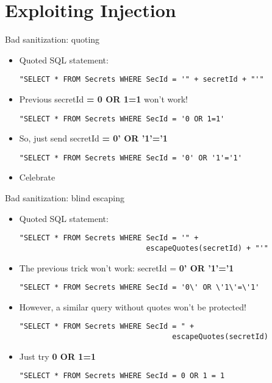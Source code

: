 \section{Exploiting Injection}

\begin{frame}[fragile]{Bad sanitization: quoting}
  \ccode
  \begin{itemize}
    \item Quoted SQL statement:
\begin{lstlisting}
"SELECT * FROM Secrets WHERE SecId = '" + secretId + "'"
\end{lstlisting}
\pause
    \item Previous secretId \textbf{= 0 OR 1=1} won't work!
\begin{lstlisting}
"SELECT * FROM Secrets WHERE SecId = '0 OR 1=1'
\end{lstlisting}
\pause
    \item So, just send secretId \textbf{= 0' OR '1'='1}
\begin{lstlisting}
"SELECT * FROM Secrets WHERE SecId = '0' OR '1'='1'
\end{lstlisting}
    \item Celebrate
  \end{itemize}
\end{frame}

\begin{frame}[fragile]{Bad sanitization: blind escaping}
  \ccode
  \begin{itemize}
    \item Quoted SQL statement:
\begin{lstlisting}
"SELECT * FROM Secrets WHERE SecId = '" +
                             escapeQuotes(secretId) + "'"
\end{lstlisting}
\pause
    \item The previous trick won't work: secretId = \textbf{0' OR '1'='1}
\begin{lstlisting}
"SELECT * FROM Secrets WHERE SecId = '0\' OR \'1\'=\'1'
\end{lstlisting}
\pause
    \item However, a similar query without quotes won't be protected!
\begin{lstlisting}
"SELECT * FROM Secrets WHERE SecId = " +
                                   escapeQuotes(secretId)
\end{lstlisting}
\pause
    \item Just try \textbf{0 OR 1=1}
\begin{lstlisting}
"SELECT * FROM Secrets WHERE SecId = 0 OR 1 = 1
\end{lstlisting}
  \end{itemize}
\end{frame}

